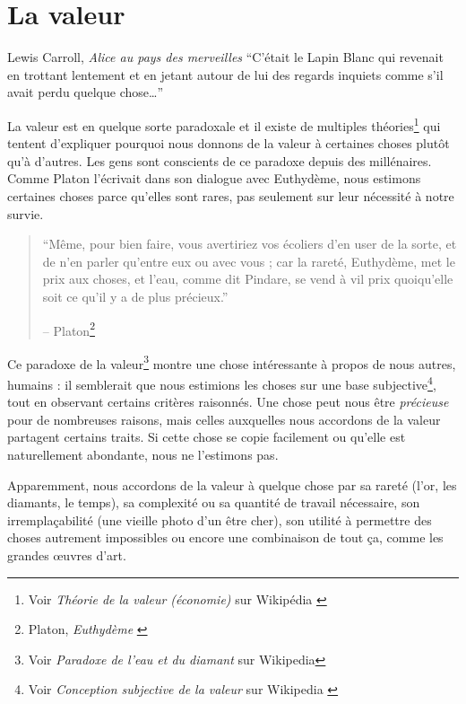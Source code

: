 \chapter{La valeur}
\label{les:10}

\begin{chapquote}{Lewis Carroll, \textit{Alice au pays des merveilles}}
\enquote{C’était le Lapin Blanc qui revenait en trottant lentement et en jetant
autour de lui des regards inquiets comme s’il avait perdu quelque chose\ldots}
\end{chapquote}

La valeur est en quelque sorte paradoxale et il existe de multiples
théories\footnote{Voir \textit{Théorie de la valeur (économie)} sur Wikipédia
\cite{wiki:theory-of-value}} qui tentent d'expliquer pourquoi nous donnons de la
valeur à certaines choses plutôt qu'à d'autres. Les gens sont conscients de ce
paradoxe depuis des millénaires. Comme Platon l'écrivait dans son dialogue avec
Euthydème, nous estimons certaines choses parce qu'elles sont rares, pas
seulement sur leur nécessité à notre survie.

\begin{quotation}\begin{samepage}
\enquote{Même, pour bien faire, vous avertiriez vos écoliers d'en user de la
sorte, et de n'en parler qu'entre eux ou avec vous ; car la rareté, Euthydème,
met le prix aux choses, et l'eau, comme dit Pindare, se vend à vil prix
quoiqu'elle soit ce qu'il y a de plus précieux.}
\begin{flushright} -- Platon\footnote{Platon, \textit{Euthydème}
\cite{euthydemus}}
\end{flushright}\end{samepage}\end{quotation}

Ce paradoxe de la valeur\footnote{Voir \textit{Paradoxe de l'eau et du diamant}
sur Wikipedia\cite{wiki:paradox-of-value}} montre une chose intéressante à
propos de nous autres, humains : il semblerait que nous estimions les choses sur
une base subjective\footnote{Voir \textit{Conception subjective de la valeur}
sur Wikipedia \cite{wiki:subjective-theory-of-value}}, tout en observant
certains critères raisonnés. Une chose peut nous être \textit{précieuse} pour de
nombreuses raisons, mais celles auxquelles nous accordons de la valeur partagent
certains traits. Si cette chose se copie facilement ou qu'elle est naturellement
abondante, nous ne l'estimons pas.

Apparemment, nous accordons de la valeur à quelque chose par sa rareté (l'or,
les diamants, le temps), sa complexité ou sa quantité de travail nécessaire, son
irremplaçabilité (une vieille photo d'un être cher), son utilité à permettre des
choses autrement impossibles ou encore une combinaison de tout ça, comme les
grandes œuvres d'art.


